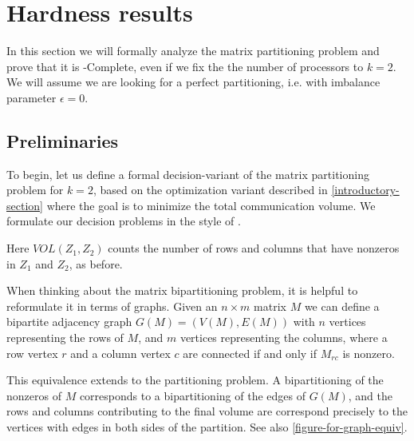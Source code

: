 \documentclass{article}
\newcommand{\mbpt}{\textsc{Matrix \allowbreak Bipartition} }
\begin{document}
	\section{Hardness results}
	In this section we will formally analyze the matrix partitioning
	problem and prove that it is \NP-Complete, even if we fix the
	the number of processors to $k = 2$. We will assume we are looking
	for a perfect partitioning, i.e. with imbalance parameter $\epsilon = 0$.

	\subsection{Preliminaries}
	\label{1-preliminaries}
	To begin, let us define a formal decision-variant of the matrix
	partitioning problem for $k = 2$, based on the optimization
	variant described in \autoref{introductory-section} where the goal
	is to minimize the total communication volume. We formulate our
	decision problems in the style of \cite{npbook}.

	\begin{problem}
		\problemtitle{\mbpt}
	\end{problem}

	Here $VOL(Z_1, Z_2)$ counts the number of rows and columns that
	have nonzeros in $Z_1$ and $Z_2$, as before.

	When thinking about the matrix bipartitioning problem, it is helpful
	to reformulate it in terms of graphs. Given an $n \times m$ matrix $M$
	we can define a bipartite adjacency graph $G(M) = (V(M), E(M))$ with
	$n$ vertices representing the rows of $M$, and $m$ vertices representing
	the columns, where a row vertex $r$ and a column vertex $c$ are connected
	if and only if $M_{rc}$ is nonzero.

	This equivalence extends to the partitioning problem. A bipartitioning of
	the nonzeros of $M$ corresponds to a bipartitioning of the edges of $G(M)$,
	and the rows and columns contributing to the final volume are correspond
	precisely to the vertices with edges in both sides of the partition. See
	also \autoref{figure-for-graph-equiv}.

\end{document}
